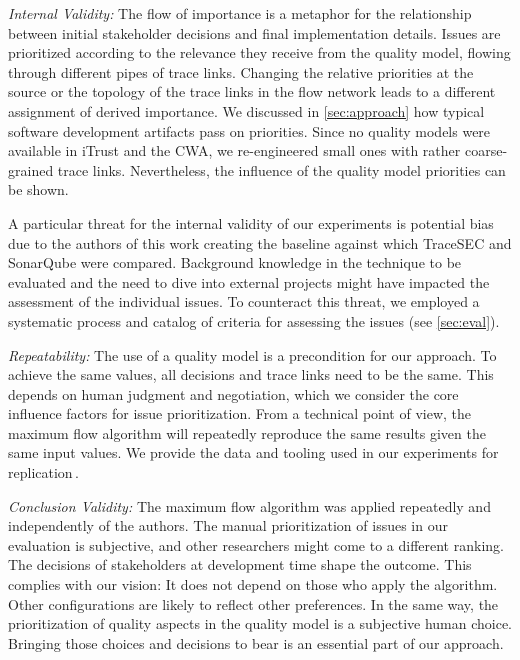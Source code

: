 \textit{Internal Validity:}
The flow of importance is a metaphor for the relationship between initial stakeholder decisions and final implementation details.
Issues are prioritized according to the relevance they receive from the quality model, flowing through different pipes of trace links.
Changing the relative priorities at the source or the topology of the trace links in the flow network leads to a different assignment of derived importance. We discussed in \autoref{sec:approach} how typical software development artifacts pass on priorities.
Since no quality models were available in iTrust and the CWA, we re-engineered small ones with rather coarse-grained trace links.
Nevertheless, the influence of the quality model priorities can be shown.

	A particular threat for the internal validity of our experiments is potential bias due to the authors of this work creating the baseline against which TraceSEC and SonarQube were compared.
	Background knowledge in the technique to be evaluated and the need to dive into external projects might have impacted the assessment of the individual issues.
	To counteract this threat, we employed a systematic process and catalog of criteria for assessing the issues (see \autoref{sec:eval}).

\textit{Repeatability:}
The use of a quality model is a precondition for our approach.
To achieve the same values, all decisions and trace links need to be the same.
This depends on human judgment and negotiation, which we consider the core influence factors for issue prioritization. From a technical point of view, the maximum flow algorithm will repeatedly reproduce the same results given the same input values.
We provide the data and tooling used in our experiments for replication\,\cite{replication}.

\textit{Conclusion Validity:}
The maximum flow algorithm was applied repeatedly and independently of the authors.
The manual prioritization of issues in our evaluation is subjective, and other researchers might come to a different ranking.
The decisions of  stakeholders at development time shape the outcome.
This complies with our vision: It does not depend on those who apply the algorithm.
Other configurations are likely to reflect other preferences. In the same way, the prioritization of quality aspects in the quality model is a subjective human choice. Bringing those choices and decisions to bear is an essential part of our approach.

